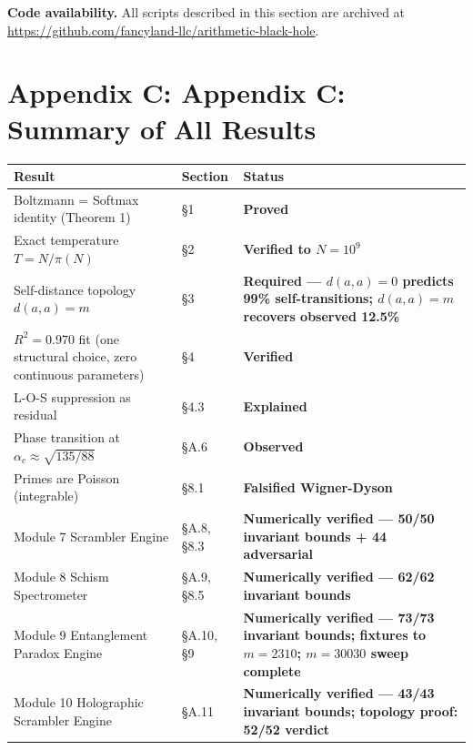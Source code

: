 \documentclass[
  11pt,
]{article}
\newcounter{none} %
\numberwithin{equation}{section}
\begin{document}
\textbf{Code availability.} All scripts described in this section are
archived at
\url{https://github.com/fancyland-llc/arithmetic-black-hole}.





\clearpage
\section{Appendix C: Appendix C: Summary of All
Results}\label{appendix-c-summary-of-all-results}

{\def\LTcaptype{none} %
\begin{longtable}[]{@{}
  >{\raggedright\arraybackslash}p{}
  >{\raggedright\arraybackslash}p{}
  >{\raggedright\arraybackslash}p{}@{}}
\toprule\noalign{}
Result & Section & Status \\
\midrule\noalign{}
\endhead
\bottomrule\noalign{}
\endlastfoot
Boltzmann = Softmax identity (Theorem 1) & §1 & \textbf{Proved} \\
Exact temperature \(T = N/\pi(N)\) & §2 & \textbf{Verified to
\(N = 10^9\)} \\
Self-distance topology \(d(a,a) = m\) & §3 & \textbf{Required ---
\(d(a,a)=0\) predicts 99\% self-transitions; \(d(a,a)=m\) recovers
observed 12.5\%} \\
\(R^2 = 0.970\) fit (one structural choice, zero continuous parameters)
& §4 & \textbf{Verified} \\
L-O-S suppression as residual & §4.3 & \textbf{Explained} \\
Phase transition at \(\alpha_c \approx \sqrt{135/88}\) & §A.6 &
\textbf{Observed} \\
Primes are Poisson (integrable) & §8.1 & \textbf{Falsified
Wigner-Dyson} \\
Module 7 Scrambler Engine & §A.8, §8.3 & \textbf{Numerically verified
--- 50/50 invariant bounds + 44 adversarial} \\
Module 8 Schism Spectrometer & §A.9, §8.5 & \textbf{Numerically verified
--- 62/62 invariant bounds} \\
Module 9 Entanglement Paradox Engine & §A.10, §9 & \textbf{Numerically
verified --- 73/73 invariant bounds; fixtures to \(m = 2310\);
\(m = 30030\) sweep complete} \\
Module 10 Holographic Scrambler Engine & §A.11 & \textbf{Numerically
verified --- 43/43 invariant bounds; topology proof: 52/52 verdict
}
\end{longtable}}
\end{document}
